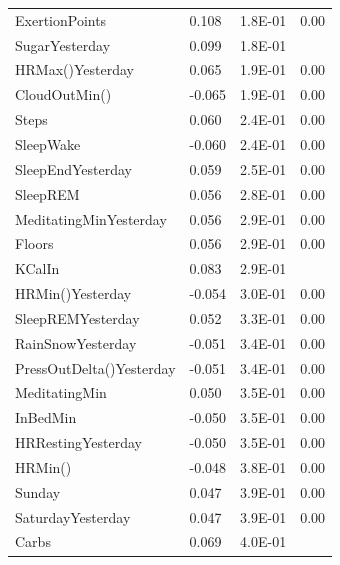 \documentclass[conference]{IEEEtran}
\begin{document}
\begin{table}[]
\begin{tabular}{llll}
ExertionPoints                 & 0.108  & 1.8E-01          & 0.00           \\
SugarYesterday                 & 0.099  & 1.8E-01          &                \\
HRMax()Yesterday               & 0.065  & 1.9E-01          & 0.00           \\
CloudOutMin()                  & -0.065 & 1.9E-01          & 0.00           \\
Steps                          & 0.060  & 2.4E-01          & 0.00           \\
SleepWake                      & -0.060 & 2.4E-01          & 0.00           \\
SleepEndYesterday              & 0.059  & 2.5E-01          & 0.00           \\
SleepREM                       & 0.056  & 2.8E-01          & 0.00           \\
MeditatingMinYesterday         & 0.056  & 2.9E-01          & 0.00           \\
Floors                         & 0.056  & 2.9E-01          & 0.00           \\
KCalIn                         & 0.083  & 2.9E-01          &                \\
HRMin()Yesterday               & -0.054 & 3.0E-01          & 0.00           \\
SleepREMYesterday              & 0.052  & 3.3E-01          & 0.00           \\
RainSnowYesterday              & -0.051 & 3.4E-01          & 0.00           \\
PressOutDelta()Yesterday       & -0.051 & 3.4E-01          & 0.00           \\
MeditatingMin                  & 0.050  & 3.5E-01          & 0.00           \\
InBedMin                       & -0.050 & 3.5E-01          & 0.00           \\
HRRestingYesterday             & -0.050 & 3.5E-01          & 0.00           \\
HRMin()                        & -0.048 & 3.8E-01          & 0.00           \\
Sunday                         & 0.047  & 3.9E-01          & 0.00           \\
SaturdayYesterday              & 0.047  & 3.9E-01          & 0.00           \\
Carbs                          & 0.069  & 4.0E-01          &                \\

\end{tabular}
\end{table}
\end{document}
